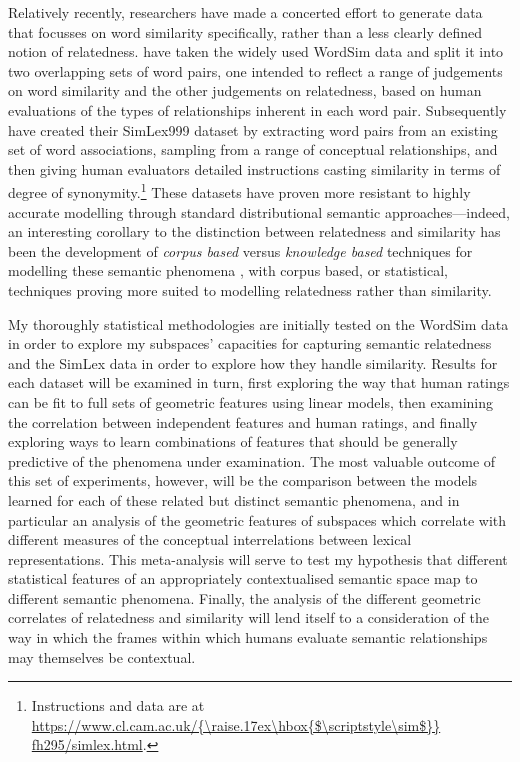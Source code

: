 Relatively recently, researchers have made a concerted effort to generate data that focusses on word similarity specifically, rather than a less clearly defined notion of relatedness.  \cite{AgirreEA2009} have taken the widely used WordSim data and split it into two overlapping sets of word pairs, one intended to reflect a range of judgements on word similarity and the other judgements on relatedness, based on human evaluations of the types of relationships inherent in each word pair.  Subsequently \cite{HillEA2015} have created their SimLex999 dataset by extracting word pairs from an existing set of word associations, sampling from a range of conceptual relationships, and then giving human evaluators detailed instructions casting similarity in terms of degree of synonymity.\footnote{Instructions and data are at \url{https://www.cl.cam.ac.uk/{\raise.17ex\hbox{$\scriptstyle\sim$}} fh295/simlex.html}.}  These datasets have proven more resistant to highly accurate modelling through standard distributional semantic approaches---indeed, an interesting corollary to the distinction between relatedness and similarity has been the development of \emph{corpus based} versus \emph{knowledge based} techniques for modelling these semantic phenomena \citep[see][for a discussion]{MihalceaEA2006,HassanEA2011}, with corpus based, or statistical, techniques proving more suited to modelling relatedness rather than similarity.

My thoroughly statistical methodologies are initially tested on the WordSim data in order to explore my subspaces' capacities for capturing semantic relatedness and the SimLex data in order to explore how they handle similarity.  Results for each dataset will be examined in turn, first exploring the way that human ratings can be fit to full sets of geometric features using linear models, then examining the correlation between independent features and human ratings, and finally exploring ways to learn combinations of features that should be generally predictive of the phenomena under examination.  The most valuable outcome of this set of experiments, however, will be the comparison between the models learned for each of these related but distinct semantic phenomena, and in particular an analysis of the geometric features of subspaces which correlate with different measures of the conceptual interrelations between lexical representations.  This meta-analysis will serve to test my hypothesis that different statistical features of an appropriately contextualised semantic space map to different semantic phenomena.  Finally, the analysis of the different geometric correlates of relatedness and similarity will lend itself to a consideration of the way in which the frames within which humans evaluate semantic relationships may themselves be contextual.

